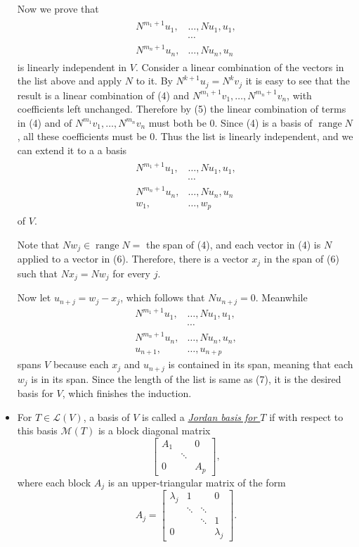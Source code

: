 \documentclass[11pt]{article}
\newcommand{\df}[1]{\ul{\textit{\textsf{#1}}}}
\renewcommand{\r}{\operatorname{range}}
\newcommand{\LV}{\mathcal{L}(V)}
\newcommand{\M}{\mathcal{M}}
\begin{document}
\begin{itemize}
    Now we prove that \begin{align}
    \begin{split}
        N^{m_1+1}u_1,&\dots,Nu_1,u_1, \\ &\cdots \\ N^{m_n+1}u_n,&\dots,Nu_n,u_n
    \end{split} \end{align} is linearly independent in $V$. Consider a linear combination of the vectors in the list above and apply $N$ to it. By $N^{k+1}u_j = N^k v_j$ it is easy to see that the result is a linear combination of (4) and $N^{m_1+1}v_1,\dots,N^{m_n+1}v_n$, with coefficients left unchanged. Therefore by (5) the linear combination of terms in (4) and of $N^{m_1}v_1,\dots,N^{m_n}v_n$ must both be 0. Since (4) is a basis of $\r N$, all these coefficients must be 0. Thus the list is linearly independent, and we can extend it to a a basis \begin{align}
    \begin{split}
        N^{m_1+1}u_1,&\dots,Nu_1,u_1, \\ &\cdots \\ N^{m_n+1}u_n,&\dots,Nu_n,u_n \\ w_1,&\dots,w_p
    \end{split}
    \end{align} of $V$.

    Note that $Nw_j \in \r N =$ the span of (4), and each vector in (4) is $N$ applied to a vector in (6). Therefore, there is a vector $x_j$ in the span of (6) such that $Nx_j = Nw_j$ for every $j$.

    Now let $u_{n+j} = w_j - x_j$, which follows that $Nu_{n+j} = 0$. Meanwhile \begin{align*}
        N^{m_1+1}u_1,&\dots,Nu_1,u_1, \\ &\cdots \\ N^{m_n+1}u_n,&\dots,Nu_n,u_n, \\ u_{n+1},&\dots,u_{n+p}
    \end{align*}
    spans $V$ because each $x_j$ and $u_{n+j}$ is contained in its span, meaning that each $w_j$ is in its span. Since the length of the list is same as (7), it is the desired basis for $V$, which finishes the induction.
    \item For $T \in \LV$, a basis of $V$ is called a \df{Jordan basis for $T$} if with respect to this basis $\M(T)$ is a block diagonal matrix \[\begin{bmatrix}
        A_1 & & 0 \\ & \ddots & \\ 0 & & A_p
    \end{bmatrix},\] where each block $A_j$ is an upper-triangular matrix of the form \[A_j = \begin{bmatrix}
        \lambda_j & 1 & & 0 \\
        & \ddots & \ddots & \\
        & & \ddots & 1 \\
        0 & & & \lambda_j
    \end{bmatrix}.\]


\end{itemize}
\end{document}
